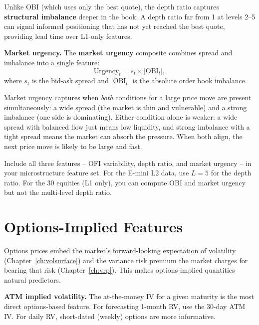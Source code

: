 Unlike OBI (which uses only the best quote), the depth ratio captures \textbf{structural imbalance} deeper in the book.
A depth ratio far from 1 at levels 2--5 can signal informed positioning that has not yet reached the best quote, providing lead time over L1-only features.

\textbf{Market urgency.}
The \textbf{market urgency} composite combines spread and imbalance into a single feature:
\begin{equation}\label{eq:market-urgency}
\text{Urgency}_t = s_t \times |\text{OBI}_t|,
\end{equation}
where $s_t$ is the bid-ask spread and $|\text{OBI}_t|$ is the absolute order book imbalance.

\begin{intuition}
Market urgency captures when \emph{both} conditions for a large price move are present simultaneously: a wide spread (the market is thin and vulnerable) and a strong imbalance (one side is dominating).
Either condition alone is weaker: a wide spread with balanced flow just means low liquidity, and strong imbalance with a tight spread means the market can absorb the pressure.
When both align, the next price move is likely to be large and fast.
\end{intuition}

\begin{projectconnection}
Include all three features -- OFI variability, depth ratio, and market urgency -- in your microstructure feature set.
For the E-mini L2 data, use $L = 5$ for the depth ratio.
For the 30 equities (L1 only), you can compute OBI and market urgency but not the multi-level depth ratio.
\end{projectconnection}

\section{Options-Implied Features}\label{sec:feat-options}

Options prices embed the market's forward-looking expectation of volatility (Chapter~\ref{ch:volsurface}) and the variance risk premium the market charges for bearing that risk (Chapter~\ref{ch:vrp}).
This makes options-implied quantities natural predictors.

\textbf{ATM implied volatility.}
The at-the-money IV for a given maturity is the most direct options-based feature.
For forecasting 1-month RV, use the 30-day ATM IV.
For daily RV, short-dated (weekly) options are more informative.

